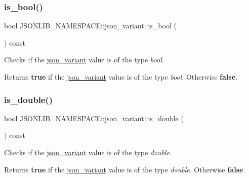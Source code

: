 \subsubsection{\texorpdfstring{is\+\_\+bool()}{is\_bool()}\hspace{0.1cm}{\footnotesize\ttfamily [2/2]}}
{\footnotesize\ttfamily bool J\+S\+O\+N\+L\+I\+B\+\_\+\+N\+A\+M\+E\+S\+P\+A\+C\+E\+::json\+\_\+variant\+::is\+\_\+bool (\begin{DoxyParamCaption}{ }\end{DoxyParamCaption}) const}



Checks if the \hyperlink{classJSONLIB__NAMESPACE_1_1json__variant}{json\+\_\+variant} value is of the type {\itshape bool}. 

\begin{DoxyReturn}{Returns}
{\bfseries true} if the \hyperlink{classJSONLIB__NAMESPACE_1_1json__variant}{json\+\_\+variant} value is of the type {\itshape bool}. Otherwise {\bfseries false}. 
\end{DoxyReturn}
\mbox{\label{classJSONLIB__NAMESPACE_1_1json__variant_a7f294ce9b078aca12e0f96df7275ff0b}} 
\subsubsection{\texorpdfstring{is\+\_\+double()}{is\_double()}\hspace{0.1cm}{\footnotesize\ttfamily [1/2]}}
{\footnotesize\ttfamily bool J\+S\+O\+N\+L\+I\+B\+\_\+\+N\+A\+M\+E\+S\+P\+A\+C\+E\+::json\+\_\+variant\+::is\+\_\+double (\begin{DoxyParamCaption}{ }\end{DoxyParamCaption}) const}



Checks if the \hyperlink{classJSONLIB__NAMESPACE_1_1json__variant}{json\+\_\+variant} value is of the type {\itshape double}. 

\begin{DoxyReturn}{Returns}
{\bfseries true} if the \hyperlink{classJSONLIB__NAMESPACE_1_1json__variant}{json\+\_\+variant} value is of the type {\itshape double}. Otherwise {\bfseries false}. 
\end{DoxyReturn}
\mbox{\label{classJSONLIB__NAMESPACE_1_1json__variant_a7f294ce9b078aca12e0f96df7275ff0b}} 
